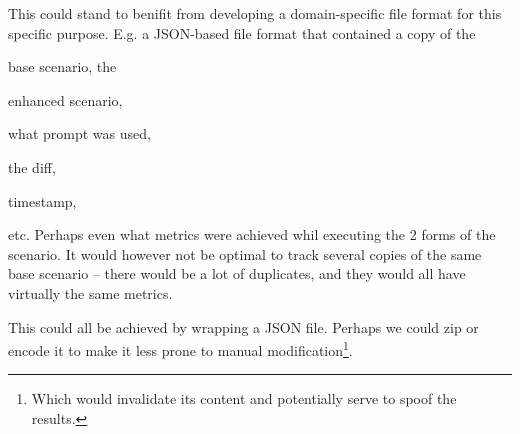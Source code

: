 This could stand to benifit from developing a domain-specific file format for this specific purpose.
E.g. a JSON-based file format that contained a copy of the \begin{inparaenum}
    \item base scenario, the
    \item enhanced scenario,
    \item what prompt was used,
    \item the diff,
    \item timestamp,
\end{inparaenum} etc. Perhaps even what metrics were achieved whil executing the 2 forms of the
scenario. It would however not be optimal to track several copies of the same base scenario -- there
would be a lot of duplicates, and they would all have virtually the same metrics.

This could all be achieved by wrapping a JSON file. Perhaps we could zip or encode it to make it
less prone to manual modification\footnote{Which would invalidate its content and potentially serve
    to spoof the results.}.
